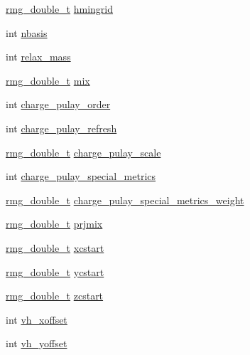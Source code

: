 \begin{DoxyCompactItemize}
\hyperlink{rmgtypes_8h_aaa16921c14f121c56eaa42390a340db8}{rmg\-\_\-double\-\_\-t} \hyperlink{struct_c_o_n_t_r_o_l_a090c9f414369c97b1f76af36a2a1535f}{hmingrid}
\item 
int \hyperlink{struct_c_o_n_t_r_o_l_af278f5911a4cb1876c8ce71558b9dab9}{nbasis}
\item 
int \hyperlink{struct_c_o_n_t_r_o_l_ace6ec45dbb971f442dc79211ccd03955}{relax\-\_\-mass}
\item 
\hyperlink{rmgtypes_8h_aaa16921c14f121c56eaa42390a340db8}{rmg\-\_\-double\-\_\-t} \hyperlink{struct_c_o_n_t_r_o_l_a396a51d569f9f5a97dd5c3614de23144}{mix}
\item 
int \hyperlink{struct_c_o_n_t_r_o_l_a938e4b96d4c591f6a93faca8786a7400}{charge\-\_\-pulay\-\_\-order}
\item 
int \hyperlink{struct_c_o_n_t_r_o_l_aacf810c92564dc26939525d0468f4d97}{charge\-\_\-pulay\-\_\-refresh}
\item 
\hyperlink{rmgtypes_8h_aaa16921c14f121c56eaa42390a340db8}{rmg\-\_\-double\-\_\-t} \hyperlink{struct_c_o_n_t_r_o_l_a999bf04e317db074f1ca526ef057504f}{charge\-\_\-pulay\-\_\-scale}
\item 
int \hyperlink{struct_c_o_n_t_r_o_l_a57f801302ea9c4caf5cad578d48d0211}{charge\-\_\-pulay\-\_\-special\-\_\-metrics}
\item 
\hyperlink{rmgtypes_8h_aaa16921c14f121c56eaa42390a340db8}{rmg\-\_\-double\-\_\-t} \hyperlink{struct_c_o_n_t_r_o_l_a4ea8d234ab05797265dcac53d29d19ff}{charge\-\_\-pulay\-\_\-special\-\_\-metrics\-\_\-weight}
\item 
\hyperlink{rmgtypes_8h_aaa16921c14f121c56eaa42390a340db8}{rmg\-\_\-double\-\_\-t} \hyperlink{struct_c_o_n_t_r_o_l_a297cca931baf08bb88e0e6749674ce9b}{prjmix}
\item 
\hyperlink{rmgtypes_8h_aaa16921c14f121c56eaa42390a340db8}{rmg\-\_\-double\-\_\-t} \hyperlink{struct_c_o_n_t_r_o_l_af3094e0ef2988cd227051e02e68d9f2c}{xcstart}
\item 
\hyperlink{rmgtypes_8h_aaa16921c14f121c56eaa42390a340db8}{rmg\-\_\-double\-\_\-t} \hyperlink{struct_c_o_n_t_r_o_l_a99c3a7b1396fd9ce069ca94cf1abe4be}{ycstart}
\item 
\hyperlink{rmgtypes_8h_aaa16921c14f121c56eaa42390a340db8}{rmg\-\_\-double\-\_\-t} \hyperlink{struct_c_o_n_t_r_o_l_aa378c698d5096f7f07d405ca5243d23c}{zcstart}
\item 
int \hyperlink{struct_c_o_n_t_r_o_l_af02b4a0d974317d41c59a7a096cc60b4}{vh\-\_\-xoffset}
\item 
int \hyperlink{struct_c_o_n_t_r_o_l_a3421c34bc85198a7d519a957390d6a0e}{vh\-\_\-yoffset}

\end{DoxyCompactItemize}
